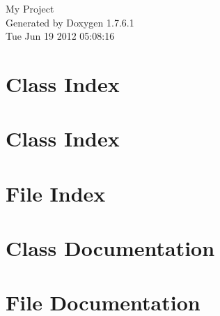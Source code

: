 \documentclass[a4paper]{book}
\begin{document}
\hypersetup{pageanchor=false,citecolor=blue}
\begin{titlepage}
\vspace*{7cm}
\begin{center}
{\Large \-My \-Project }\\
\vspace*{1cm}
{\large \-Generated by Doxygen 1.7.6.1}\\
\vspace*{0.5cm}
{\small Tue Jun 19 2012 05:08:16}\\
\end{center}
\end{titlepage}
\clearemptydoublepage
{}
\tableofcontents
\clearemptydoublepage
{}
\hypersetup{pageanchor=true,citecolor=blue}
\chapter{\-Class \-Index}

\chapter{\-Class \-Index}

\chapter{\-File \-Index}

\chapter{\-Class \-Documentation}



















\chapter{\-File \-Documentation}


















\printindex
\end{document}
